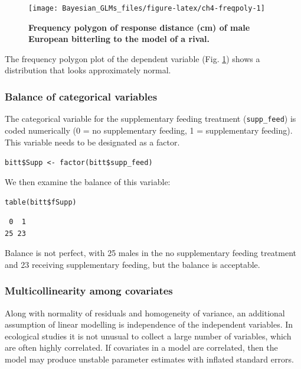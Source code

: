 \documentclass[
]{book}
\begin{document}
\begin{figure}

{\centering \texttt{[image: Bayesian\_GLMs\_files/figure-latex/ch4-freqpoly-1]} 

}

\caption{\textbf{Frequency polygon of response distance (cm) of male European bitterling to the model of a rival.}}\label{fig:ch4-freqpoly}
\end{figure}

The frequency polygon plot of the dependent variable (Fig. \ref{fig:ch4-freqpoly}) shows a distribution that looks approximately normal.

\hypertarget{balance-of-categorical-variables}{%
\subsubsection{Balance of categorical variables}\label{balance-of-categorical-variables}}

The categorical variable for the supplementary feeding treatment (\texttt{supp\_feed}) is coded numerically (0 = no supplementary feeding, 1 = supplementary feeding). This variable needs to be designated as a factor.

\texttt{bitt\$Supp\ \textless{}-\ factor(bitt\$supp\_feed)}

We then examine the balance of this variable:

\texttt{table(bitt\$fSupp)}

\begin{verbatim}
 0  1 
25 23 
\end{verbatim}

Balance is not perfect, with 25 males in the no supplementary feeding treatment and 23 receiving supplementary feeding, but the balance is acceptable.

\hypertarget{multicollinearity-among-covariates-1}{%
\subsubsection{Multicollinearity among covariates}\label{multicollinearity-among-covariates-1}}

Along with normality of residuals and homogeneity of variance, an additional assumption of linear modelling is independence of the independent variables. In ecological studies it is not unusual to collect a large number of variables, which are often highly correlated. If covariates in a model are correlated, then the model may produce unstable parameter estimates with inflated standard errors.
\end{document}
